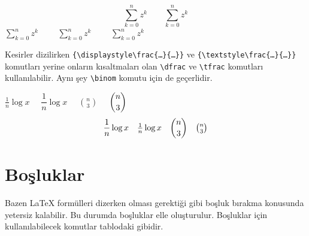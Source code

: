 \documentclass[
  10pt,
]{scrbook}
\newenvironment{Shaded}{}{}
\newcommand{\FunctionTok}[1]{\textcolor[rgb]{0.02,0.16,0.49}{#1}}
\newcommand{\SpecialCharTok}[1]{\textcolor[rgb]{0.25,0.44,0.63}{#1}}
\newcommand{\SpecialStringTok}[1]{\textcolor[rgb]{0.73,0.40,0.53}{#1}}
\theoremstyle{definition}
\theoremstyle{definition}
\theoremstyle{definition}
\theoremstyle{definition}
\theoremstyle{remark}
\begin{document}
\[
\sum_{k=0}^n z^k \qquad \textstyle\sum_{k=0}^n z^k
\] \(\displaystyle\sum_{k=0}^n z^k\qquad\) \(\sum_{k=0}^n z^k\qquad\) \(\scriptstyle\sum_{k=0}^n z^k\)

Kesirler dizilirken \texttt{\{\textbackslash{}displaystyle\textbackslash{}frac\{…\}\{…\}\}} ve \texttt{\{\textbackslash{}textstyle\textbackslash{}frac\{…\}\{…\}\}} komutları yerine onların kısaltmaları olan \texttt{\textbackslash{}dfrac} ve \texttt{\textbackslash{}tfrac} komutları kullanılabilir. Aynı şey \texttt{\textbackslash{}binom} komutu için de geçerlidir.

\begin{Shaded}
\end{Shaded}

\(\frac{1}{n}\log x\quad\) \(\dfrac{1}{n}\log x\quad\) \(\binom{n}{3}\quad\) \(\dbinom{n}{3}\) \[
\frac{1}{n}\log x \quad
\tfrac{1}{n}\log x \quad
\binom{n}{3} \quad
\tbinom{n}{3}
\]

\hypertarget{boux15fluklar}{%
\section{Boşluklar}\label{boux15fluklar}}

Bazen LaTeX formülleri dizerken olması gerektiği gibi boşluk bırakma konusunda yetersiz kalabilir. Bu durumda boşluklar elle oluşturulur. Boşluklar için kullanılabilecek komutlar tablodaki gibidir.
\end{document}
